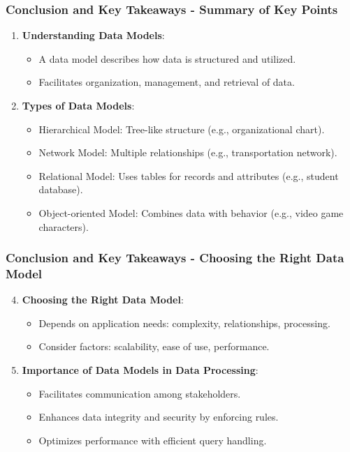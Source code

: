 \documentclass[aspectratio=169]{beamer}
\begin{document}
\begin{frame}[fragile]
    \frametitle{Conclusion and Key Takeaways - Summary of Key Points}
    \begin{enumerate}
        \item \textbf{Understanding Data Models}:
        \begin{itemize}
            \item A data model describes how data is structured and utilized.
            \item Facilitates organization, management, and retrieval of data.
        \end{itemize}
        
        \item \textbf{Types of Data Models}:
        \begin{itemize}
            \item Hierarchical Model: Tree-like structure (e.g., organizational chart).
            \item Network Model: Multiple relationships (e.g., transportation network).
            \item Relational Model: Uses tables for records and attributes (e.g., student database).
            \item Object-oriented Model: Combines data with behavior (e.g., video game characters).
        \end{itemize}
    \end{enumerate}
\end{frame}

\begin{frame}[fragile]
    \frametitle{Conclusion and Key Takeaways - Choosing the Right Data Model}
    \begin{enumerate}
        \setcounter{enumi}{3}
        \item \textbf{Choosing the Right Data Model}:
        \begin{itemize}
            \item Depends on application needs: complexity, relationships, processing.
            \item Consider factors: scalability, ease of use, performance.
        \end{itemize}

        \item \textbf{Importance of Data Models in Data Processing}:
        \begin{itemize}
            \item Facilitates communication among stakeholders.
            \item Enhances data integrity and security by enforcing rules.
            \item Optimizes performance with efficient query handling.
        \end{itemize}
    \end{enumerate}
\end{frame}
\end{document}
